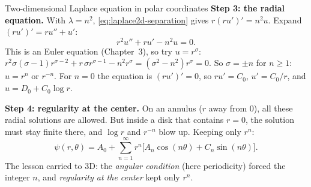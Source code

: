 \documentclass[11pt]{beamer}
\begin{document}
\begin{frame}[allowframebreaks=1.00]{Two-dimensional Laplace equation in polar coordinates}
\textbf{Step 3: the radial equation.} With \(\lambda=n^2\), \eqref{eq:laplace2d-separation} gives \(r(ru')'=n^2u\).
Expand \((ru')'=ru''+u'\):
\begin{equation}
  r^2u''+ru'-n^2u=0.
  \label{eq:laplace2d-radial}
\end{equation}
This is an Euler equation (Chapter~3), so try \(u=r^\sigma\):
\(r^2\sigma(\sigma-1)r^{\sigma-2}+r\,\sigma r^{\sigma-1}-n^2r^\sigma=(\sigma^2-n^2)r^\sigma=0\).
So \(\sigma=\pm n\) for \(n\ge1\): \(u=r^n\) or \(r^{-n}\). For \(n=0\) the equation is \((ru')'=0\), so \(ru'=C_0\),
\(u'=C_0/r\), and \(u=D_0+C_0\log r\).

\textbf{Step 4: regularity at the center.} On an annulus (\(r\) away from \(0\)), all these radial solutions are
allowed. But inside a disk that contains \(r=0\), the solution must stay finite there, and \(\log r\) and
\(r^{-n}\) blow up. Keeping only \(r^n\):
\begin{equation}
  \psi(r,\theta)
   =A_0+\sum_{n=1}^{\infty}r^n
       \bigl[A_n\cos(n\theta)+C_n\sin(n\theta)\bigr].
  \label{eq:laplace2d-sol}
\end{equation}
The lesson carried to 3D: the \emph{angular condition} (here periodicity) forced the
integer $n$, and \emph{regularity at the center} kept only $r^n$.
\end{frame}
\end{document}

